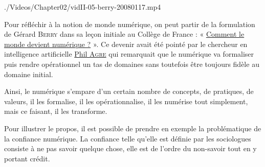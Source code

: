\begin{marginvideo}
		{./Videos/Chapter02/vidII-05-berry-20080117.mp4}%
\end{marginvideo}

Pour réfléchir à la notion de monde numérique, on peut partir de la formulation de Gérard \textsc{Berry} dans sa leçon initiale au Collège de France : « \href{https://www.college-de-france.fr/site/gerard-berry/inaugural-lecture-2008-01-17-18h00.htm}{Comment le monde devient numérique ?} ». Ce devenir avait été pointé par le chercheur en intelligence artificielle \href{https://en.wikipedia.org/wiki/Philip_E._Agre}{Phil \textsc{Agre}} qui remarquait que le numérique va formaliser puis rendre opérationnel un tas de domaines sans toutefois être toujours fidèle au domaine initial.


Ainsi, le numérique s'empare d'un certain nombre de concepts, de pratiques, de valeurs, il les formalise, il les opérationnalise, il les numérise tout simplement, mais ce faisant, il les transforme.

Pour illustrer le propos, il est possible de prendre en exemple la problématique de la confiance numérique. La confiance telle qu'elle est définie par les sociologues consiste à ne pas savoir quelque chose, elle est de l'ordre du non-­savoir tout en y portant crédit.

